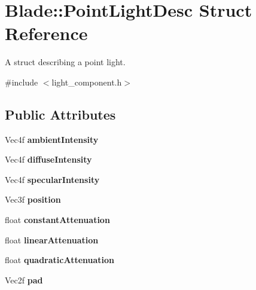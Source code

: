 \hypertarget{struct_blade_1_1_point_light_desc}{}\section{Blade\+:\+:Point\+Light\+Desc Struct Reference}
\label{struct_blade_1_1_point_light_desc}


A struct describing a point light.  




{\ttfamily \#include $<$light\+\_\+component.\+h$>$}

\subsection*{Public Attributes}
\begin{DoxyCompactItemize}
\item 
\mbox{\label{struct_blade_1_1_point_light_desc_ab5a5c5594188eb4a48433a57c69e223c}} 
Vec4f {\bfseries ambient\+Intensity}
\item 
\mbox{\label{struct_blade_1_1_point_light_desc_a5da1931cba52459b067e689fa9347963}} 
Vec4f {\bfseries diffuse\+Intensity}
\item 
\mbox{\label{struct_blade_1_1_point_light_desc_adcead88e629c1e9defba3aee8085a1e2}} 
Vec4f {\bfseries specular\+Intensity}
\item 
\mbox{\label{struct_blade_1_1_point_light_desc_a4a566f59cabe3382fb278957a411952b}} 
Vec3f {\bfseries position}
\item 
\mbox{\label{struct_blade_1_1_point_light_desc_a5693572f09d64d19554c7cbceac7f4ec}} 
float {\bfseries constant\+Attenuation}
\item 
\mbox{\label{struct_blade_1_1_point_light_desc_a4bef661df60949afcdc00bf4b29f7c0e}} 
float {\bfseries linear\+Attenuation}
\item 
\mbox{\label{struct_blade_1_1_point_light_desc_a9ec597895c5523456a17247a7aac4487}} 
float {\bfseries quadratic\+Attenuation}
\item 
\mbox{\label{struct_blade_1_1_point_light_desc_abe2d8b440bc43e88702140a1a45e0888}} 
Vec2f {\bfseries pad}
\end{DoxyCompactItemize}


